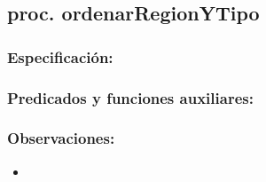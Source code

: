 

\subsection{proc. ordenarRegionYTipo}
    \subsubsection{Especificaci\'on:}    
    \subsubsection{Predicados y funciones auxiliares:}
    \subsubsection{Observaciones:}
        \begin{itemize}
            \item
        \end{itemize}